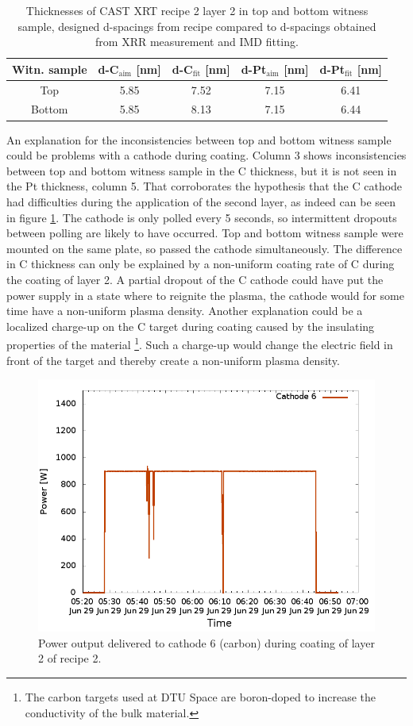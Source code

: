 \begin{table}
  \centering
\begin{tabular}{c|c|c|c|c}
Witn. sample& d-C$_{\text{aim}}$ [nm]&d-C$_{\text{fit}}$ [nm]&d-Pt$_{\text{aim}}$ [nm]&d-Pt$_{\text{fit}}$ [nm]\\
\hline
Top&5.85&7.52&7.15&6.41\\
Bottom&5.85&8.13&7.15&6.44\\
\end{tabular}
\caption{\footnotesize Thicknesses of CAST XRT recipe 2 layer 2 in top and bottom witness sample, designed d-spacings from recipe compared to d-spacings obtained from XRR measurement and IMD fitting.}\label{tab:recipe2layer2}
\end{table}

An explanation for the inconsistencies between top and bottom witness sample could be problems with a cathode during coating. Column 3 shows inconsistencies between top and bottom witness sample in the C thickness, but it is not seen in the Pt thickness, column 5. That corroborates the hypothesis that the C cathode had difficulties during the application of the second layer, as indeed can be seen in figure \ref{fig:cast_coatings_power_recipe2_layer2}. The cathode is only polled every 5 seconds, so intermittent dropouts between polling are likely to have occurred. Top and bottom witness sample were mounted on the same plate, so passed the cathode simultaneously. The difference in C thickness can only be explained by a non-uniform coating rate of C during the coating of layer 2. A partial dropout of the C cathode could have put the power supply in a state where to reignite the plasma, the cathode would for some time have a non-uniform plasma density. Another explanation could be a localized charge-up on the C target during coating caused by the insulating properties of the material \footnote{The carbon targets used at DTU Space are boron-doped to increase the conductivity of the bulk material.}. Such a charge-up would change the electric field in front of the target and thereby create a non-uniform plasma density.

\begin{figure}[htbp]
  \centering  \includegraphics[width=0.7\linewidth]{figures/cast/power_cat6.png}
  \caption{\footnotesize Power output delivered to cathode 6 (carbon) during coating of layer 2 of recipe 2. }
  \label{fig:cast_coatings_power_recipe2_layer2}
\end{figure}


